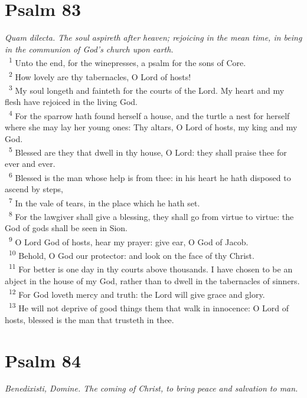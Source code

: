 \documentclass[a5paper,12pt]{article}
\begin{document}
\begin{multicols*}{2}
\section{Psalm 83}
\label{sec:org59b15c8}
\emph{Quam dilecta. The soul aspireth after heaven; rejoicing in the mean time, in being in the communion of God's church upon earth.}\\

~\textsuperscript{1} Unto the end, for the winepresses, a psalm for the sons of Core.\\
~\textsuperscript{2} How lovely are thy tabernacles, O Lord of hosts!\\
~\textsuperscript{3} My soul longeth and fainteth for the courts of the Lord. My heart and my flesh have rejoiced in the living God.\\
~\textsuperscript{4} For the sparrow hath found herself a house, and the turtle a nest for herself where she may lay her young ones: Thy altars, O Lord of hosts, my king and my God.\\
~\textsuperscript{5} Blessed are they that dwell in thy house, O Lord: they shall praise thee for ever and ever.\\
~\textsuperscript{6} Blessed is the man whose help is from thee: in his heart he hath disposed to ascend by steps,\\
~\textsuperscript{7} In the vale of tears, in the place which he hath set.\\
~\textsuperscript{8} For the lawgiver shall give a blessing, they shall go from virtue to virtue: the God of gods shall be seen in Sion.\\
~\textsuperscript{9} O Lord God of hosts, hear my prayer: give ear, O God of Jacob.\\
~\textsuperscript{10} Behold, O God our protector: and look on the face of thy Christ.\\
~\textsuperscript{11} For better is one day in thy courts above thousands. I have chosen to be an abject in the house of my God, rather than to dwell in the tabernacles of sinners.\\
~\textsuperscript{12} For God loveth mercy and truth: the Lord will give grace and glory.\\
~\textsuperscript{13} He will not deprive of good things them that walk in innocence: O Lord of hosts, blessed is the man that trusteth in thee.\\

\section{Psalm 84}
\label{sec:orgf3def2a}
\emph{Benedixisti, Domine. The coming of Christ, to bring peace and salvation to man.}\\


\end{multicols*}
\end{document}
